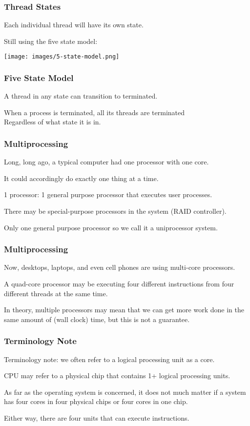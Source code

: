 \begin{frame}
	\frametitle{Thread States}
	Each individual thread will have its own state.
	
	Still using the five state model:

	\begin{center}
		\texttt{[image: images/5-state-model.png]}
	\end{center}

\end{frame}

\begin{frame}
	\frametitle{Five State Model}

    A thread in any state can transition to terminated.

	When a process is terminated, all its threads are terminated\\
	\quad Regardless of what state it is in.


\end{frame}


\begin{frame}
	\frametitle{Multiprocessing}

	Long, long ago, a typical computer had one processor with one core.

	It could accordingly do exactly one thing at a time.

	1 processor: 1 general purpose processor that executes user processes.

	There may be special-purpose processors in the system (RAID controller).

	Only one general purpose processor so we call it a uniprocessor system.



\end{frame}


\begin{frame}
	\frametitle{Multiprocessing}

	Now, desktops, laptops, and even cell phones are using multi-core processors.

	A quad-core processor may be executing four different instructions from four different threads at the same time.

	In theory, multiple processors may mean that we can get more work done in the same amount of (wall clock) time, but this is not a guarantee.

\end{frame}


\begin{frame}
	\frametitle{Terminology Note}


	Terminology note: we often refer to a logical processing unit as a \alert{core}.

	CPU may refer to a physical chip that contains 1+ logical processing units.

	As far as the operating system is concerned, it does not much matter if a system has four cores in four physical chips or four cores in one chip.

	Either way, there are four units that can execute instructions.



\end{frame}


